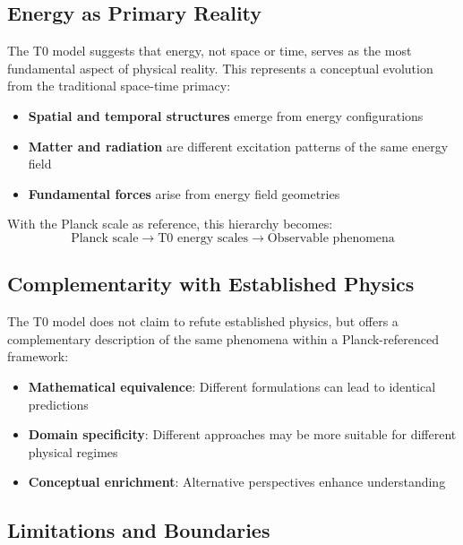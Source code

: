 \documentclass[12pt,a4paper]{report}
\begin{document}
	\subsection{Energy as Primary Reality}\label{subsec:energy_primary_reality}
	
	The T0 model suggests that energy, not space or time, serves as the most fundamental aspect of physical reality. This represents a conceptual evolution from the traditional space-time primacy:
	
	\begin{itemize}
		\item \textbf{Spatial and temporal structures} emerge from energy configurations
		\item \textbf{Matter and radiation} are different excitation patterns of the same energy field
		\item \textbf{Fundamental forces} arise from energy field geometries
	\end{itemize}
	
	With the Planck scale as reference, this hierarchy becomes:
	\begin{equation}
		\text{Planck scale} \to \text{T0 energy scales} \to \text{Observable phenomena}
	\end{equation}
	
	\subsection{Complementarity with Established Physics}\label{subsec:complementarity}
	
	The T0 model does not claim to refute established physics, but offers a complementary description of the same phenomena within a Planck-referenced framework:
	
	\begin{itemize}
		\item \textbf{Mathematical equivalence}: Different formulations can lead to identical predictions
		\item \textbf{Domain specificity}: Different approaches may be more suitable for different physical regimes
		\item \textbf{Conceptual enrichment}: Alternative perspectives enhance understanding
	\end{itemize}
	
	\subsection{Limitations and Boundaries}\label{subsec:limitations_boundaries}
	
\end{document}
